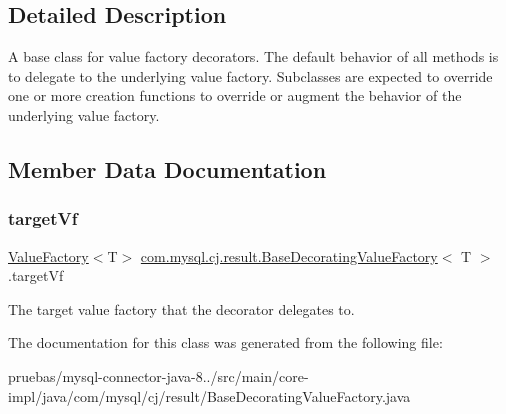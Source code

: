 \subsection{Detailed Description}
A base class for value factory decorators. The default behavior of all methods is to delegate to the underlying value factory. Subclasses are expected to override one or more creation functions to override or augment the behavior of the underlying value factory. 

\subsection{Member Data Documentation}
\mbox{\label{classcom_1_1mysql_1_1cj_1_1result_1_1_base_decorating_value_factory_a64c2c62bd9906ec3af7fc62e58bf34b3}} 
\subsubsection{\texorpdfstring{target\+Vf}{targetVf}}
{\footnotesize\ttfamily \mbox{\hyperlink{interfacecom_1_1mysql_1_1cj_1_1result_1_1_value_factory}{Value\+Factory}}$<$T$>$ \mbox{\hyperlink{classcom_1_1mysql_1_1cj_1_1result_1_1_base_decorating_value_factory}{com.\+mysql.\+cj.\+result.\+Base\+Decorating\+Value\+Factory}}$<$ T $>$.target\+Vf\hspace{0.3cm}{\ttfamily [protected]}}

The target value factory that the decorator delegates to. 

The documentation for this class was generated from the following file\+:\begin{DoxyCompactItemize}
\item 
pruebas/mysql-\/connector-\/java-\/8../src/main/core-\/impl/java/com/mysql/cj/result/Base\+Decorating\+Value\+Factory.\+java\end{DoxyCompactItemize}
